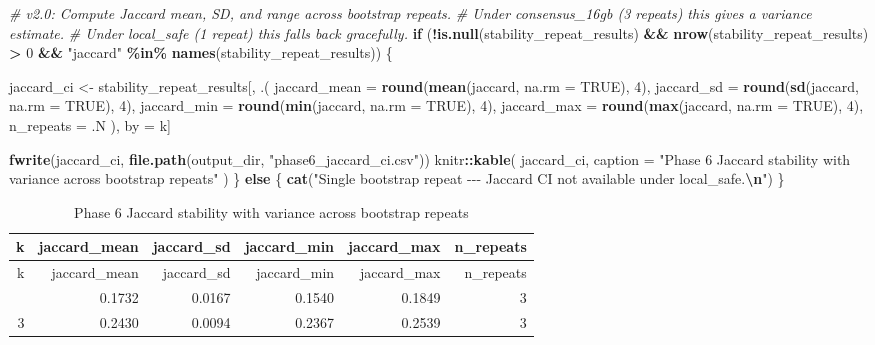 \documentclass[
]{article}
\newenvironment{Shaded}{\begin{snugshade}}{\end{snugshade}}
\newcommand{\AttributeTok}[1]{\textcolor[rgb]{0.13,0.29,0.53}{#1}}
\newcommand{\CommentTok}[1]{\textcolor[rgb]{0.56,0.35,0.01}{\textit{#1}}}
\newcommand{\ConstantTok}[1]{\textcolor[rgb]{0.56,0.35,0.01}{#1}}
\newcommand{\ControlFlowTok}[1]{\textcolor[rgb]{0.13,0.29,0.53}{\textbf{#1}}}
\newcommand{\DecValTok}[1]{\textcolor[rgb]{0.00,0.00,0.81}{#1}}
\newcommand{\FunctionTok}[1]{\textcolor[rgb]{0.13,0.29,0.53}{\textbf{#1}}}
\newcommand{\NormalTok}[1]{#1}
\newcommand{\OtherTok}[1]{\textcolor[rgb]{0.56,0.35,0.01}{#1}}
\newcommand{\SpecialCharTok}[1]{\textcolor[rgb]{0.81,0.36,0.00}{\textbf{#1}}}
\newcommand{\StringTok}[1]{\textcolor[rgb]{0.31,0.60,0.02}{#1}}
\begin{document}
\begin{Shaded}
\begin{Highlighting}[]
\CommentTok{\# v2.0: Compute Jaccard mean, SD, and range across bootstrap repeats.}
\CommentTok{\# Under consensus\_16gb (3 repeats) this gives a variance estimate.}
\CommentTok{\# Under local\_safe (1 repeat) this falls back gracefully.}
\ControlFlowTok{if}\NormalTok{ (}\SpecialCharTok{!}\FunctionTok{is.null}\NormalTok{(stability\_repeat\_results) }\SpecialCharTok{\&\&}
    \FunctionTok{nrow}\NormalTok{(stability\_repeat\_results) }\SpecialCharTok{\textgreater{}} \DecValTok{0} \SpecialCharTok{\&\&}
    \StringTok{"jaccard"} \SpecialCharTok{\%in\%} \FunctionTok{names}\NormalTok{(stability\_repeat\_results)) \{}

\NormalTok{  jaccard\_ci }\OtherTok{\textless{}{-}}\NormalTok{ stability\_repeat\_results[, .(}
    \AttributeTok{jaccard\_mean =} \FunctionTok{round}\NormalTok{(}\FunctionTok{mean}\NormalTok{(jaccard, }\AttributeTok{na.rm =} \ConstantTok{TRUE}\NormalTok{), }\DecValTok{4}\NormalTok{),}
    \AttributeTok{jaccard\_sd   =} \FunctionTok{round}\NormalTok{(}\FunctionTok{sd}\NormalTok{(jaccard,   }\AttributeTok{na.rm =} \ConstantTok{TRUE}\NormalTok{), }\DecValTok{4}\NormalTok{),}
    \AttributeTok{jaccard\_min  =} \FunctionTok{round}\NormalTok{(}\FunctionTok{min}\NormalTok{(jaccard,  }\AttributeTok{na.rm =} \ConstantTok{TRUE}\NormalTok{), }\DecValTok{4}\NormalTok{),}
    \AttributeTok{jaccard\_max  =} \FunctionTok{round}\NormalTok{(}\FunctionTok{max}\NormalTok{(jaccard,  }\AttributeTok{na.rm =} \ConstantTok{TRUE}\NormalTok{), }\DecValTok{4}\NormalTok{),}
    \AttributeTok{n\_repeats    =}\NormalTok{ .N}
\NormalTok{  ), by }\OtherTok{=}\NormalTok{ k]}

  \FunctionTok{fwrite}\NormalTok{(jaccard\_ci, }\FunctionTok{file.path}\NormalTok{(output\_dir, }\StringTok{"phase6\_jaccard\_ci.csv"}\NormalTok{))}
\NormalTok{  knitr}\SpecialCharTok{::}\FunctionTok{kable}\NormalTok{(}
\NormalTok{    jaccard\_ci,}
    \AttributeTok{caption =} \StringTok{"Phase 6 Jaccard stability with variance across bootstrap repeats"}
\NormalTok{  )}
\NormalTok{\} }\ControlFlowTok{else}\NormalTok{ \{}
  \FunctionTok{cat}\NormalTok{(}\StringTok{"Single bootstrap repeat {-}{-}{-} Jaccard CI not available under local\_safe.}\SpecialCharTok{\textbackslash{}n}\StringTok{"}\NormalTok{)}
\NormalTok{\}}
\end{Highlighting}
\end{Shaded}

\begin{longtable}[]{@{}rrrrrr@{}}
\caption{Phase 6 Jaccard stability with variance across bootstrap
repeats}\tabularnewline
\toprule\noalign{}
k & jaccard\_mean & jaccard\_sd & jaccard\_min & jaccard\_max &
n\_repeats \\
\midrule\noalign{}
\endfirsthead
\toprule\noalign{}
k & jaccard\_mean & jaccard\_sd & jaccard\_min & jaccard\_max &
n\_repeats \\
\midrule\noalign{}
\endhead
\bottomrule\noalign{}
\endlastfoot
7 & 0.1732 & 0.0167 & 0.1540 & 0.1849 & 3 \\
3 & 0.2430 & 0.0094 & 0.2367 & 0.2539 & 3 \\
\end{longtable}
\end{document}
